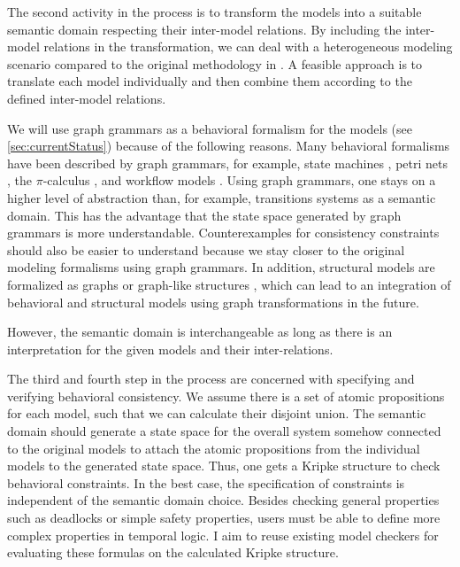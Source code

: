 \documentclass[conference]{IEEEtran}
\begin{document}
The second activity in the process is to transform the models into a suitable semantic domain respecting their inter-model relations.
By including the inter-model relations in the transformation, we can deal with a heterogeneous modeling scenario compared to the original methodology in \cite{engelsMethodologySpecifyingAnalyzing2001}.
A feasible approach is to translate each model individually and then combine them according to the defined inter-model relations.

We will use graph grammars as a behavioral formalism for the models (see \autoref{sec:currentStatus}) because of the following reasons.
Many behavioral formalisms have been described by graph grammars, for example, state machines \cite{kuskeFormalSemanticsUML2001, varroFormalSemanticsUML2002}, petri nets \cite{ehrigGraphGrammarsPetri2004}, the $\pi$-calculus \cite{gadducciGraphRewritingPcalculus2007}, and workflow models \cite{rutleMetamodellingApproachBehavioural2012}.
Using graph grammars, one stays on a higher level of abstraction than, for example, transitions systems as a semantic domain.
This has the advantage that the state space generated by graph grammars is more understandable.
Counterexamples for consistency constraints should also be easier to understand because we stay closer to the original modeling formalisms using graph grammars.
In addition, structural models are formalized as graphs or graph-like structures \cite{stunkelMultipleModelSynchronization2020}, which can lead to an integration of behavioral and structural models using graph transformations in the future. 

However, the semantic domain is interchangeable as long as there is an interpretation for the given models and their inter-relations.

The third and fourth step in the process are concerned with specifying and verifying behavioral consistency.
We assume there is a set of atomic propositions for each model, such that we can calculate their disjoint union.
The semantic domain should generate a state space for the overall system somehow connected to the original models to attach the atomic propositions from the individual models to the generated state space.
Thus, one gets a Kripke structure to check behavioral constraints.
In the best case, the specification of constraints is independent of the semantic domain choice.
Besides checking general properties such as deadlocks or simple safety properties, users must be able to define more complex properties in temporal logic.
I aim to reuse existing model checkers for evaluating these formulas on the calculated Kripke structure.
\end{document}
